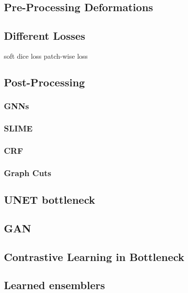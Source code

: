 \subsection{Pre-Processing Deformations}

\subsection{Different Losses}
soft dice loss
patch-wise loss
\subsection{Post-Processing}

    \subsubsection{GNNs}

    \subsubsection{SLIME}

    \subsubsection{CRF}

    \subsubsection{Graph Cuts}

\subsection{UNET bottleneck}


\subsection{GAN}

\subsection{Contrastive Learning in Bottleneck}

\subsection{Learned ensemblers}
